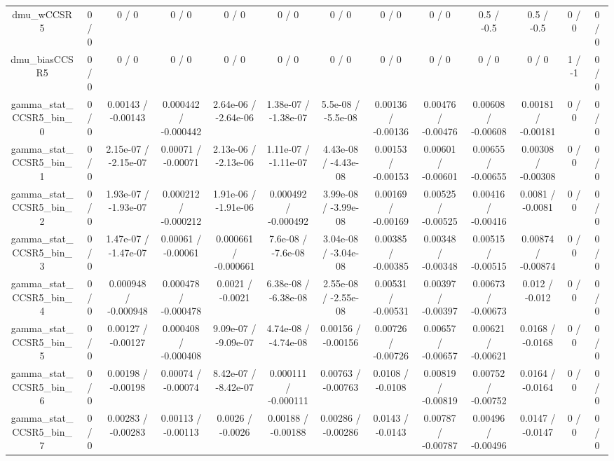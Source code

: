 \documentclass[10pt]{article}
\begin{document}
\begin{table}[htbp]
\begin{center}
\begin{tabular}{|c|c|c|c|c|c|c|c|c|c|c|c|c|}
  dmu_wCCSR5 & 0 / 0 & 0 / 0 & 0 / 0 & 0 / 0 & 0 / 0 & 0 / 0 & 0 / 0 & 0 / 0 & 0.5 / -0.5 & 0.5 / -0.5 & 0 / 0 & 0 / 0 \\ 
  dmu_biasCCSR5 & 0 / 0 & 0 / 0 & 0 / 0 & 0 / 0 & 0 / 0 & 0 / 0 & 0 / 0 & 0 / 0 & 0 / 0 & 0 / 0 & 1 / -1 & 0 / 0 \\ 
  gamma_stat_CCSR5_bin_0 & 0 / 0 & 0.00143 / -0.00143 & 0.000442 / -0.000442 & 2.64e-06 / -2.64e-06 & 1.38e-07 / -1.38e-07 & 5.5e-08 / -5.5e-08 & 0.00136 / -0.00136 & 0.00476 / -0.00476 & 0.00608 / -0.00608 & 0.00181 / -0.00181 & 0 / 0 & 0 / 0 \\ 
  gamma_stat_CCSR5_bin_1 & 0 / 0 & 2.15e-07 / -2.15e-07 & 0.00071 / -0.00071 & 2.13e-06 / -2.13e-06 & 1.11e-07 / -1.11e-07 & 4.43e-08 / -4.43e-08 & 0.00153 / -0.00153 & 0.00601 / -0.00601 & 0.00655 / -0.00655 & 0.00308 / -0.00308 & 0 / 0 & 0 / 0 \\ 
  gamma_stat_CCSR5_bin_2 & 0 / 0 & 1.93e-07 / -1.93e-07 & 0.000212 / -0.000212 & 1.91e-06 / -1.91e-06 & 0.000492 / -0.000492 & 3.99e-08 / -3.99e-08 & 0.00169 / -0.00169 & 0.00525 / -0.00525 & 0.00416 / -0.00416 & 0.0081 / -0.0081 & 0 / 0 & 0 / 0 \\ 
  gamma_stat_CCSR5_bin_3 & 0 / 0 & 1.47e-07 / -1.47e-07 & 0.00061 / -0.00061 & 0.000661 / -0.000661 & 7.6e-08 / -7.6e-08 & 3.04e-08 / -3.04e-08 & 0.00385 / -0.00385 & 0.00348 / -0.00348 & 0.00515 / -0.00515 & 0.00874 / -0.00874 & 0 / 0 & 0 / 0 \\ 
  gamma_stat_CCSR5_bin_4 & 0 / 0 & 0.000948 / -0.000948 & 0.000478 / -0.000478 & 0.0021 / -0.0021 & 6.38e-08 / -6.38e-08 & 2.55e-08 / -2.55e-08 & 0.00531 / -0.00531 & 0.00397 / -0.00397 & 0.00673 / -0.00673 & 0.012 / -0.012 & 0 / 0 & 0 / 0 \\ 
  gamma_stat_CCSR5_bin_5 & 0 / 0 & 0.00127 / -0.00127 & 0.000408 / -0.000408 & 9.09e-07 / -9.09e-07 & 4.74e-08 / -4.74e-08 & 0.00156 / -0.00156 & 0.00726 / -0.00726 & 0.00657 / -0.00657 & 0.00621 / -0.00621 & 0.0168 / -0.0168 & 0 / 0 & 0 / 0 \\ 
  gamma_stat_CCSR5_bin_6 & 0 / 0 & 0.00198 / -0.00198 & 0.00074 / -0.00074 & 8.42e-07 / -8.42e-07 & 0.000111 / -0.000111 & 0.00763 / -0.00763 & 0.0108 / -0.0108 & 0.00819 / -0.00819 & 0.00752 / -0.00752 & 0.0164 / -0.0164 & 0 / 0 & 0 / 0 \\ 
  gamma_stat_CCSR5_bin_7 & 0 / 0 & 0.00283 / -0.00283 & 0.00113 / -0.00113 & 0.0026 / -0.0026 & 0.00188 / -0.00188 & 0.00286 / -0.00286 & 0.0143 / -0.0143 & 0.00787 / -0.00787 & 0.00496 / -0.00496 & 0.0147 / -0.0147 & 0 / 0 & 0 / 0 \\ 

\end{tabular}
\end{center}
\end{table}
\end{document}
